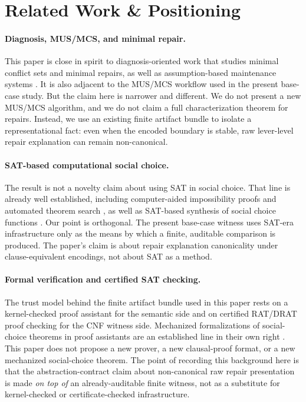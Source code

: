 \section{Related Work \& Positioning}
\label{sec:related}

\paragraph{Diagnosis, MUS/MCS, and minimal repair.}
This paper is close in spirit to diagnosis-oriented work that studies minimal conflict sets and minimal repairs, as well as assumption-based maintenance systems \citep{dekleer1986atms}.
It is also adjacent to the MUS/MCS workflow used in the present base-case study.
But the claim here is narrower and different.
We do not present a new MUS/MCS algorithm, and we do not claim a full characterization theorem for repairs.
Instead, we use an existing finite artifact bundle to isolate a representational fact:
even when the encoded boundary is stable, raw lever-level repair explanation can remain non-canonical.

\paragraph{SAT-based computational social choice.}
The result is not a novelty claim about using SAT in social choice.
That line is already well established, including computer-aided impossibility proofs and automated theorem search \citep{tanglin2009computer,geist2011automated}, as well as SAT-based synthesis of social choice functions \citep{brandtgeist2016strategyproof}.
Our point is orthogonal.
The present base-case witness uses SAT-era infrastructure only as the means by which a finite, auditable comparison is produced.
The paper's claim is about repair explanation canonicality under clause-equivalent encodings, not about SAT as a method.

\paragraph{Formal verification and certified SAT checking.}
The trust model behind the finite artifact bundle used in this paper rests on a kernel-checked proof assistant \citep{moura2021lean4} for the semantic side and on certified RAT/DRAT proof checking \citep{cruzfilipe2017lrat,wetzler2014drat} for the CNF witness side.
Mechanized formalizations of social-choice theorems in proof assistants are an established line in their own right \citep{nipkow2009social}.
This paper does not propose a new prover, a new clausal-proof format, or a new mechanized social-choice theorem.
The point of recording this background here is that the abstraction-contract claim about non-canonical raw repair presentation is made \emph{on top of} an already-auditable finite witness, not as a substitute for kernel-checked or certificate-checked infrastructure.

